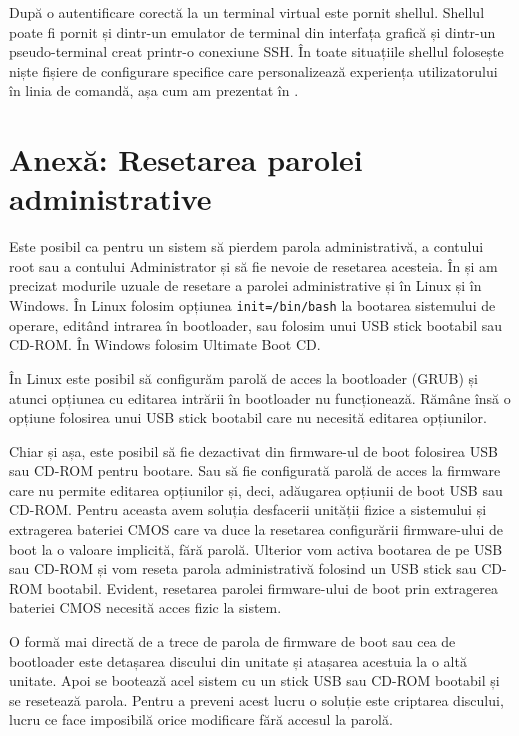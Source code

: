 După o autentificare corectă la un terminal virtual este pornit shellul.
Shellul poate fi pornit și dintr-un emulator de terminal din interfața grafică
și dintr-un pseudo-terminal creat printr-o conexiune SSH. În toate situațiile
shellul folosește niște fișiere de configurare specifice care personalizează
experiența utilizatorului în linia de comandă, așa cum am prezentat în .

\section{Anexă: Resetarea parolei administrative}
\label{sec:boot:pass-reset}

Este posibil ca pentru un sistem să pierdem parola administrativă, a contului
root sau a contului Administrator și să fie nevoie de resetarea acesteia. În
 și  am precizat modurile
uzuale de resetare a parolei administrative și în Linux și în Windows. În Linux
folosim opțiunea \texttt{init=/bin/bash} la bootarea sistemului de operare, editând
intrarea în bootloader, sau folosim unui USB stick bootabil sau CD-ROM. În
Windows folosim Ultimate Boot CD.

În Linux este posibil să configurăm parolă de acces la bootloader (GRUB) și
atunci opțiunea cu editarea intrării în bootloader nu funcționează. Rămâne însă
o opțiune folosirea unui USB stick bootabil care nu necesită editarea
opțiunilor.

Chiar și așa, este posibil să fie dezactivat din firmware-ul de boot folosirea
USB sau CD-ROM pentru bootare. Sau să fie configurată parolă de acces la firmware
care nu permite editarea opțiunilor și, deci, adăugarea opțiunii de boot USB sau
CD-ROM. Pentru aceasta avem soluția desfacerii unității fizice a sistemului și extragerea bateriei
CMOS care va duce la resetarea configurării firmware-ului de boot la o valoare
implicită, fără parolă. Ulterior vom activa bootarea de pe USB sau CD-ROM și vom
reseta parola administrativă folosind un USB stick sau CD-ROM bootabil. Evident,
resetarea parolei firmware-ului de boot prin extragerea bateriei CMOS necesită
acces fizic la sistem.

O formă mai directă de a trece de parola de firmware de boot sau cea de
bootloader este detașarea discului din unitate și atașarea acestuia la o altă
unitate. Apoi se bootează acel sistem cu un stick USB sau CD-ROM bootabil și se
resetează parola. Pentru a preveni acest lucru o soluție este criptarea
discului, lucru ce face imposibilă orice modificare fără accesul la parolă.

